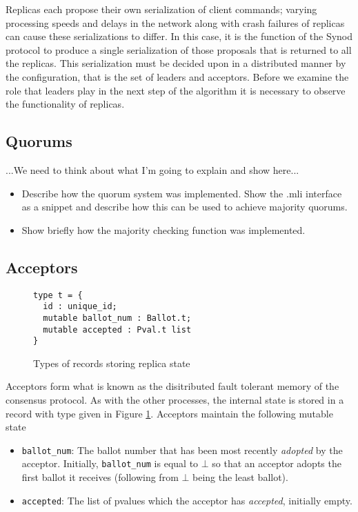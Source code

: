 Replicas each propose their own serialization of client commands; varying processing speeds and delays in the network along with crash failures of replicas can cause these serializations to differ. In this case, it is the function of the Synod protocol to produce a single serialization of those proposals that is returned to all the replicas. This serialization must be decided upon in a distributed manner by the configuration, that is the set of leaders and acceptors. Before we examine the role that leaders play in the next step of the algorithm it is necessary to observe the functionality of replicas.

\subsection{Quorums}

...We need to think about what I'm going to explain and show here... \\

\begin{itemize}
  \item Describe how the quorum system was implemented. Show the .mli interface as a snippet and describe how this can be used to achieve majority quorums.
  \item Show briefly how the majority checking function was implemented.
\end{itemize}

\subsection{Acceptors}

\begin{figure}
  \begin{lstlisting}
type t = {
  id : unique_id;
  mutable ballot_num : Ballot.t;
  mutable accepted : Pval.t list
}
\end{lstlisting}
  \centering
  \caption{Types of records storing replica state}
  \label{fig:acceptor-type}
\end{figure}

Acceptors form what is known as the disitributed fault tolerant memory of the consensus protocol. As with the other processes, the internal state is stored in a record with type given in Figure \ref{fig:acceptor-type}. Acceptors maintain the following mutable state

\begin{itemize}
  \item \texttt{ballot\_num}: The ballot number that has been most recently \emph{adopted} by the acceptor. Initially, \texttt{ballot\_num} is equal to $\bot$ so that an acceptor adopts the first ballot it receives (following from $\bot$ being the least ballot).
  \item \texttt{accepted}: The list of pvalues which the acceptor has \emph{accepted}, initially empty.
\end{itemize}

